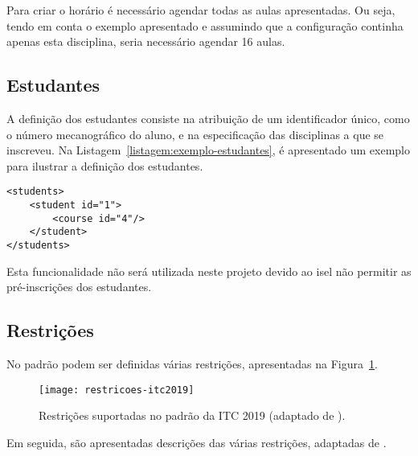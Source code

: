 Para criar o horário é necessário agendar todas as aulas apresentadas. Ou seja, tendo em conta o exemplo apresentado e assumindo que a configuração continha apenas esta disciplina, seria necessário agendar 16 aulas.


\subsection{Estudantes}

A definição dos estudantes consiste na atribuição de um identificador único, como o número mecanográfico do aluno, e na especificação das disciplinas a que se inscreveu. Na Listagem~\ref{listagem:exemplo-estudantes}, é apresentado um exemplo para ilustrar a definição dos estudantes.

\begin{minipage}[c]{\linewidth}
\begin{lstlisting}[caption={Exemplo da definição dos estudantes.}, label={listagem:exemplo-estudantes}]
<students>
    <student id="1">
        <course id="4"/>
    </student>
</students>
\end{lstlisting}
\end{minipage}

Esta funcionalidade não será utilizada neste projeto devido ao \gls{isel} não permitir as pré-inscrições dos estudantes.

\subsection{Restrições}

No padrão podem ser definidas várias restrições, apresentadas na Figura~\ref{fig:restricoes-itc2019}.

\begin{figure}[ht]
    \centering
    \texttt{[image: restricoes-itc2019]}
    \caption{Restrições suportadas no padrão da ITC 2019 (adaptado de \cite{itc2019-Website}).}
    \label{fig:restricoes-itc2019}
\end{figure}

Em seguida, são apresentadas descrições das várias restrições, adaptadas de \cite{itc2019-Website}.

